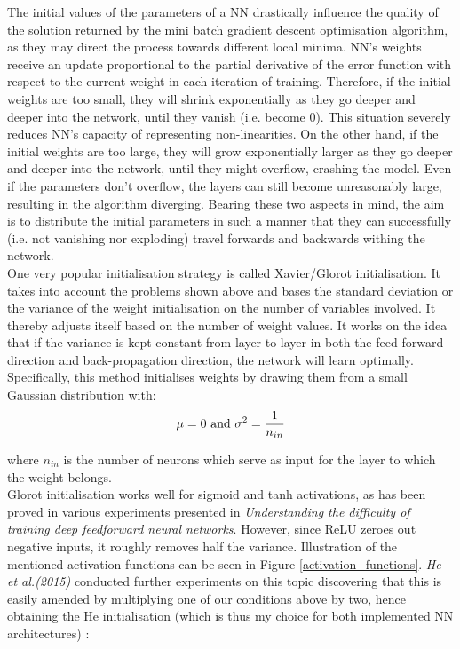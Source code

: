 The initial values of the parameters of a NN drastically influence the quality of the solution returned by the mini batch gradient descent optimisation algorithm, as they may direct the process towards different local minima. NN's weights receive an update proportional to the partial derivative of the error function with respect to the current weight in each iteration of training. Therefore, if the initial weights are too small, they will shrink exponentially as they go deeper and deeper into the network, until they vanish (i.e. become 0). This situation severely reduces NN's capacity of representing non-linearities. On the other hand, if the initial weights are too large, they will grow exponentially larger as they go deeper and deeper into the network, until they might overflow, crashing the model. Even if the parameters don't overflow, the layers can still become unreasonably large, resulting in the algorithm diverging. Bearing these two aspects in mind, the aim is to distribute the initial parameters in such a manner that they can successfully (i.e. not vanishing nor exploding) travel forwards and backwards withing the network. \\

One very popular initialisation strategy is called Xavier/Glorot initialisation. It takes into account the problems shown above and bases the standard deviation or the variance of the weight initialisation on the number of variables involved. It thereby adjusts itself based on the number of weight values. It works on the idea that if the variance is kept constant from layer to layer in both the feed forward direction and back-propagation direction, the network will learn optimally. Specifically, this method initialises weights by drawing them from a small Gaussian distribution with: \\

\begin{equation}
  \centering
  \mu = 0 \ \text{and} \ \sigma^2 = \frac{1}{n_{in}}
\end{equation}

where $n_{in}$ is the number of neurons which serve as input for the layer to which the weight belongs. \\

Glorot initialisation works well for sigmoid and tanh activations, as has been proved in various experiments presented in \textit{Understanding the difficulty of training deep feedforward neural networks}. However, since ReLU zeroes out negative inputs, it roughly removes half the variance. Illustration of the mentioned activation functions can be seen in Figure \ref{activation_functions}. \textit{He et al.(2015)} conducted further experiments on this topic discovering that this is easily amended by multiplying one of our conditions above by two, hence obtaining the He initialisation (which is thus my choice for both implemented NN architectures) :

